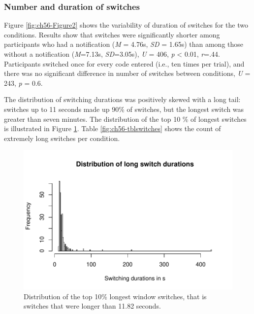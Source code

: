 \subsubsection{Number and duration of switches}
Figure \ref{fig:ch56-Figure2} shows the variability of duration of switches for the two conditions. Results show that switches were significantly shorter among participants who had a notification (\textit{M} = 4.76s, \textit{SD} = 1.65s) than among those without a notification (\textit{M}=7.13s, \textit{SD}=3.05s), \textit{U} = 406, \textit{p} < 0.01, \textit{r}=.44. Participants switched once for every code entered (i.e., ten times per trial), and there was no significant difference in number of switches between conditions, \textit{U} = 243, \textit{p} = 0.6.

The distribution of switching durations was positively skewed with a long tail: switches up to 11 seconds made up 90\% of switches, but the longest switch was greater than seven minutes. The distribution of the top 10 \% of longest switches is illustrated in Figure \ref{fig:ch56-histswitches}. 
Table \ref{fig:ch56-tblswitches} shows the count of extremely long switches per condition.

\begin{figure}
\centering
\includegraphics[width=\textwidth]{images/ch56/ch56-histswitches.pdf}
\caption{Distribution of the top 10\% longest window switches, that is switches that were longer than 11.82 seconds.}
\label{fig:ch56-histswitches}
\end{figure}

